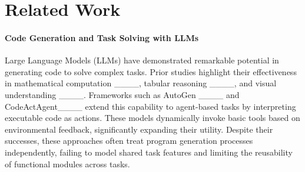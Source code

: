 \section{Related Work}
\label{sec:relatedwork}


\paragraph{Code Generation and Task Solving with LLMs} Large Language Models (LLMs) have demonstrated remarkable potential in generating code to solve complex tasks. Prior studies highlight their effectiveness in mathematical computation ____, tabular reasoning ____, and visual understanding ____. Frameworks such as AutoGen ____ and CodeActAgent____ extend this capability to agent-based tasks by interpreting executable code as actions. These models dynamically invoke basic tools based on environmental feedback, significantly expanding their utility. Despite their successes, these approaches often treat program generation processes independently, failing to model shared task features and limiting the reusability of functional modules across tasks.


